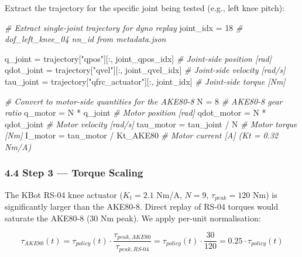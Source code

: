 \documentclass[
]{article}
\newenvironment{Shaded}{}{}
\newcommand{\CommentTok}[1]{\textcolor[rgb]{0.38,0.63,0.69}{\textit{#1}}}
\newcommand{\DecValTok}[1]{\textcolor[rgb]{0.25,0.63,0.44}{#1}}
\newcommand{\NormalTok}[1]{#1}
\newcommand{\OperatorTok}[1]{\textcolor[rgb]{0.40,0.40,0.40}{#1}}
\newcommand{\StringTok}[1]{\textcolor[rgb]{0.25,0.44,0.63}{#1}}
\begin{document}
Extract the trajectory for the specific joint being tested (e.g., left
knee pitch):

\begin{Shaded}
\begin{Highlighting}[]
\CommentTok{\# Extract single{-}joint trajectory for dyno replay}
\NormalTok{joint\_idx }\OperatorTok{=} \DecValTok{18}  \CommentTok{\# dof\_left\_knee\_04 nn\_id from metadata.json}

\NormalTok{q\_joint }\OperatorTok{=}\NormalTok{ trajectory[}\StringTok{"qpos"}\NormalTok{][:, joint\_qpos\_idx]     }\CommentTok{\# Joint{-}side position [rad]}
\NormalTok{qdot\_joint }\OperatorTok{=}\NormalTok{ trajectory[}\StringTok{"qvel"}\NormalTok{][:, joint\_qvel\_idx]   }\CommentTok{\# Joint{-}side velocity [rad/s]}
\NormalTok{tau\_joint }\OperatorTok{=}\NormalTok{ trajectory[}\StringTok{"qfrc\_actuator"}\NormalTok{][:, joint\_idx] }\CommentTok{\# Joint{-}side torque [Nm]}

\CommentTok{\# Convert to motor{-}side quantities for the AKE80{-}8}
\NormalTok{N }\OperatorTok{=} \DecValTok{8}  \CommentTok{\# AKE80{-}8 gear ratio}
\NormalTok{q\_motor }\OperatorTok{=}\NormalTok{ N }\OperatorTok{*}\NormalTok{ q\_joint               }\CommentTok{\# Motor position [rad]}
\NormalTok{qdot\_motor }\OperatorTok{=}\NormalTok{ N }\OperatorTok{*}\NormalTok{ qdot\_joint          }\CommentTok{\# Motor velocity [rad/s]}
\NormalTok{tau\_motor }\OperatorTok{=}\NormalTok{ tau\_joint }\OperatorTok{/}\NormalTok{ N            }\CommentTok{\# Motor torque [Nm]}
\NormalTok{I\_motor }\OperatorTok{=}\NormalTok{ tau\_motor }\OperatorTok{/}\NormalTok{ Kt\_AKE80      }\CommentTok{\# Motor current [A]  (Kt = 0.32 Nm/A)}
\end{Highlighting}
\end{Shaded}

\subsubsection{4.4 Step 3 --- Torque
Scaling}\label{step-3-torque-scaling}

The KBot RS-04 knee actuator (\(K_t = 2.1\) Nm/A, \(N = 9\),
\(\tau_{peak} = 120\) Nm) is significantly larger than the AKE80-8.
Direct replay of RS-04 torques would saturate the AKE80-8 (30 Nm peak).
We apply per-unit normalisation:

\[
\tau_{AKE80}(t) = \tau_{policy}(t) \cdot \frac{\tau_{peak,AKE80}}{\tau_{peak,RS\text{-}04}}
= \tau_{policy}(t) \cdot \frac{30}{120} = 0.25 \cdot \tau_{policy}(t)
\]
\end{document}
